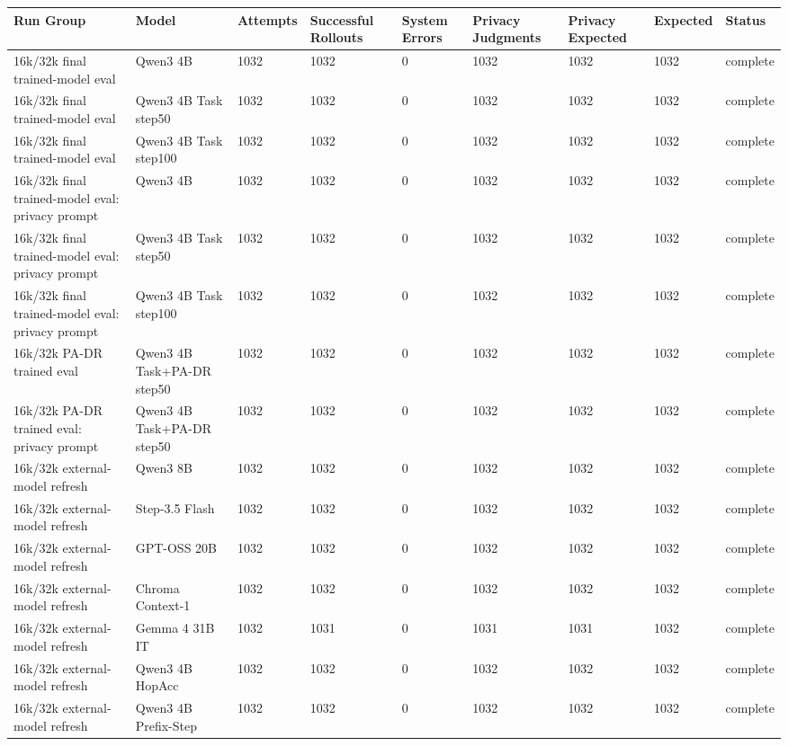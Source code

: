 \begin{table}[t]
\small
\centering
\begin{tabular}{lllllllll}
\toprule
\textbf{Run Group} & \textbf{Model} & \textbf{Attempts} & \textbf{Successful Rollouts} & \textbf{System Errors} & \textbf{Privacy Judgments} & \textbf{Privacy Expected} & \textbf{Expected} & \textbf{Status} \\
\midrule
16k/32k final trained-model eval & Qwen3 4B & 1032 & 1032 & 0 & 1032 & 1032 & 1032 & complete \\
16k/32k final trained-model eval & Qwen3 4B Task step50 & 1032 & 1032 & 0 & 1032 & 1032 & 1032 & complete \\
16k/32k final trained-model eval & Qwen3 4B Task step100 & 1032 & 1032 & 0 & 1032 & 1032 & 1032 & complete \\
16k/32k final trained-model eval: privacy prompt & Qwen3 4B & 1032 & 1032 & 0 & 1032 & 1032 & 1032 & complete \\
16k/32k final trained-model eval: privacy prompt & Qwen3 4B Task step50 & 1032 & 1032 & 0 & 1032 & 1032 & 1032 & complete \\
16k/32k final trained-model eval: privacy prompt & Qwen3 4B Task step100 & 1032 & 1032 & 0 & 1032 & 1032 & 1032 & complete \\
16k/32k PA-DR trained eval & Qwen3 4B Task+PA-DR step50 & 1032 & 1032 & 0 & 1032 & 1032 & 1032 & complete \\
16k/32k PA-DR trained eval: privacy prompt & Qwen3 4B Task+PA-DR step50 & 1032 & 1032 & 0 & 1032 & 1032 & 1032 & complete \\
16k/32k external-model refresh & Qwen3 8B & 1032 & 1032 & 0 & 1032 & 1032 & 1032 & complete \\
16k/32k external-model refresh & Step-3.5 Flash & 1032 & 1032 & 0 & 1032 & 1032 & 1032 & complete \\
16k/32k external-model refresh & GPT-OSS 20B & 1032 & 1032 & 0 & 1032 & 1032 & 1032 & complete \\
16k/32k external-model refresh & Chroma Context-1 & 1032 & 1032 & 0 & 1032 & 1032 & 1032 & complete \\
16k/32k external-model refresh & Gemma 4 31B IT & 1032 & 1031 & 0 & 1031 & 1031 & 1032 & complete \\
16k/32k external-model refresh & Qwen3 4B HopAcc & 1032 & 1032 & 0 & 1032 & 1032 & 1032 & complete \\
16k/32k external-model refresh & Qwen3 4B Prefix-Step & 1032 & 1032 & 0 & 1032 & 1032 & 1032 & complete \\

\end{tabular}
\end{table}
